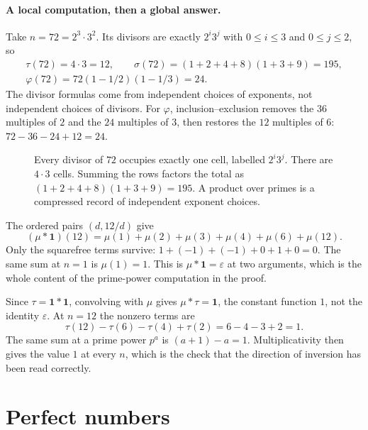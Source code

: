 \paragraph{A local computation, then a global answer.}
Take $n=72=2^3\cdot3^2$. Its divisors are exactly $2^i3^j$ with
$0\le i\le3$ and $0\le j\le2$, so
\[
\begin{gathered}
 \tau(72)=4\cdot3=12,\qquad
 \sigma(72)=(1+2+4+8)(1+3+9)=195,\\
 \varphi(72)=72(1-1/2)(1-1/3)=24.
\end{gathered}
\]
The divisor formulas come from independent choices of exponents, not independent
choices of divisors. For $\varphi$, inclusion--exclusion removes the $36$
multiples of $2$ and the $24$ multiples of $3$, then restores the $12$
multiples of $6$: $72-36-24+12=24$.

\begin{figure}[ht]
\centering
{}
\caption{Every divisor of $72$ occupies exactly one cell, labelled $2^i3^j$.
There are $4\cdot3$ cells. Summing the rows factors the total as
$(1+2+4+8)(1+3+9)=195$. A product over primes is a compressed record of
independent exponent choices.}
\label{fig:divisorgrid}
\end{figure}

\begin{examplex}[convolution at $n=12$]
The ordered pairs $(d,12/d)$ give
\[
(\mu*\mathbf 1)(12)=\mu(1)+\mu(2)+\mu(3)+\mu(4)+\mu(6)+\mu(12).
\]
Only the squarefree terms survive: $1+(-1)+(-1)+0+1+0=0$.
The same sum at $n=1$ is $\mu(1)=1$. This is $\mu*\mathbf 1=\varepsilon$ at two arguments, which is the whole content of the prime-power computation in the proof.
\end{examplex}

\begin{examplex}
Since $\tau=\mathbf 1*\mathbf 1$, convolving with $\mu$ gives $\mu*\tau=\mathbf 1$, the constant function $1$, not the identity $\varepsilon$.
At $n=12$ the nonzero terms are
\[
\tau(12)-\tau(6)-\tau(4)+\tau(2)=6-4-3+2=1.
\]
The same sum at a prime power $p^a$ is $(a+1)-a=1$. Multiplicativity then gives the value $1$ at every $n$, which is the check that the direction of inversion has been read correctly.
\end{examplex}

\section{Perfect numbers}

